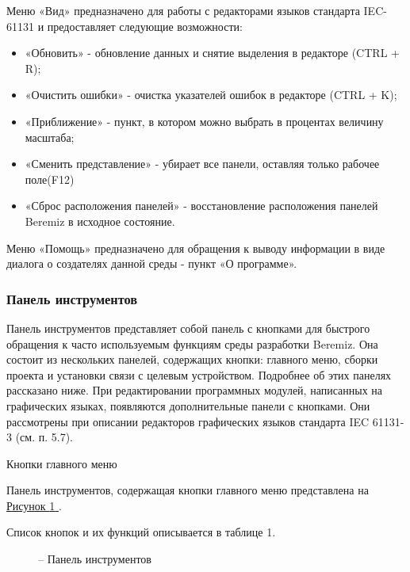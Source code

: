 \documentclass[letterpaper,10pt,russian]{sphinxmanual}
\begin{document}
Меню «Вид» предназначено для работы с редакторами языков стандарта
IEC-61131 и предоставляет следующие возможности:
\begin{itemize}
\item {} 
«Обновить» - обновление данных и снятие выделения в редакторе (CTRL +
R);

\item {} 
«Очистить ошибки» - очистка указателей ошибок в редакторе (CTRL + K);

\item {} 
«Приближение» - пункт, в котором можно выбрать в процентах величину
масштаба;

\item {} 
«Сменить представление» - убирает все панели, оставляя только рабочее
поле(F12)

\item {} 
«Сброс расположения панелей» - восстановление расположения панелей
Beremiz в исходное состояние.

\end{itemize}

Меню «Помощь» предназначено для обращения к выводу информации в виде
диалога о создателях данной среды - пункт «О программе».


\subsubsection{Панель инструментов}
\label{usage_guide/ide_components:id2}
Панель инструментов представляет собой панель с кнопками для быстрого
обращения к часто используемым функциям среды разработки Beremiz. Она
состоит из нескольких панелей, содержащих кнопки: главного меню, сборки
проекта и установки связи с целевым устройством. Подробнее об этих
панелях рассказано ниже. При редактировании программных модулей,
написанных на графических языках, появляются дополнительные панели с
кнопками. Они рассмотрены при описании редакторов графических языков
стандарта IEC 61131-3 (см. п. 5.7).

Кнопки главного меню

Панель инструментов, содержащая кнопки главного меню представлена на
\hyperref[usage_guide/ide_components:image3]{Рисунок \ref{usage_guide/ide_components:image3} }.

Список кнопок и их функций описывается в таблице 1.
\begin{figure}[htbp]
\centering
\capstart

\noindent{}
\caption{– Панель инструментов}\label{usage_guide/ide_components:image3}\end{figure}
\end{document}
